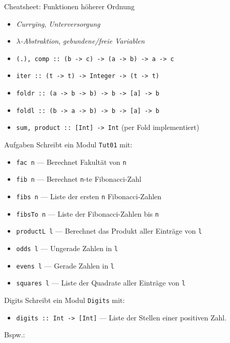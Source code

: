 \documentclass{beamer}
\begin{document}
\begin{frame}{Cheatsheet: Funktionen höherer Ordnung}
	\begin{itemize}
          \item \emph{Currying}, \emph{Unterversorgung}
          \item \emph{$\lambda$-Abstraktion}, \emph{gebundene/freie Variablen}
          \item \texttt{(.), comp :: (b -> c) -> (a -> b) -> a -> c}
          \item \texttt{iter :: (t -> t) -> Integer -> (t -> t)}
          \item \texttt{foldr :: (a -> b -> b) -> b -> [a] -> b}
          \item \texttt{foldl :: (b -> a -> b) -> b -> [a] -> b}
          \item \texttt{sum, product :: [Int] -> Int} (per Fold implementiert)
	\end{itemize}
\end{frame}

\begin{frame}{Aufgaben}
	Schreibt ein Modul \texttt{Tut01} mit:

	\begin{itemize}
		\item \texttt{fac n} --- Berechnet Fakultät von \texttt{n}
		\item \texttt{fib n} --- Berechnet \texttt{n}-te Fibonacci-Zahl
		\item \texttt{fibs n} --- Liste der ersten \texttt{n} Fibonacci-Zahlen
		\item \texttt{fibsTo n} --- Liste der Fibonacci-Zahlen bis \texttt{n}
		\item \texttt{productL l} --- Berechnet das Produkt aller Einträge von \texttt{l}
                \item \texttt{odds l} --- Ungerade Zahlen in \texttt{l}
                \item \texttt{evens l} --- Gerade Zahlen in \texttt{l}
		\item \texttt{squares l} --- Liste der Quadrate aller Einträge von \texttt{l}
	\end{itemize}
\end{frame}

\begin{frame}{Digits}
  Schreibt ein Modul \texttt{Digits} mit:

  \begin{itemize}
    \item \texttt{digits :: Int -> [Int]} --- Liste der Stellen einer positiven Zahl.
  \end{itemize}

  Bspw.:

\end{frame}
\end{document}
